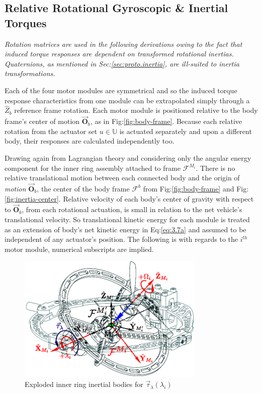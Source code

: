 \subsection{Relative Rotational Gyroscopic \& Inertial Torques}
\label{subsec:dynamics.nonlinearities.gyrotorques}
\emph{\color{gray}Rotation matrices are used in the following derivations owing to the fact that induced torque responses are dependent on transformed rotational inertias. Quaternions, as mentioned in Sec:\ref{sec:proto.inertia}, are ill-suited to inertia transformations.}
\par
Each of the four motor modules are symmetrical and so the induced torque response characteristics from one module can be extrapolated simply through a $\hat{Z}_b$ reference frame rotation. Each motor module is positioned relative to the body frame's center of motion $\vec{\mathbf{O}}_b$, as in Fig:\ref{fig:body-frame}. Because each relative rotation from the actuator set $u\in\mathbb{U}$ is actuated separately and upon a different body, their responses are calculated independently too.
\par
Drawing again from Lagrangian theory and considering only the angular energy component for the inner ring assembly attached to frame $\mathcal{F}^{M_i}$. There is no relative translational motion between each connected body and the origin of \emph{motion} $\vec{\mathbf{O}}_b$, the center of the body frame $\mathcal{F}^b$ from Fig:\ref{fig:body-frame} and Fig:\ref{fig:inertia-center}. Relative velocity of each body's center of gravity with respect to $\vec{\mathbf{O}}_b$, from each rotational actuation, is small in relation to the net vehicle's translational velocity. So translational kinetic energy for each module is treated as an extension of body's net kinetic energy in Eq:\ref{eq:3.7a} and assumed to be independent of any actuator's position. The following is with regards to the $i^{th}$ motor module, numerical subscripts are implied.
\begin{figure}[htbp]
\vspace{-12pt}
\centering
\includegraphics[width=0.8\textwidth]{figs/response-inner}
\vspace{-8pt}
\caption{Exploded inner ring inertial bodies for $\vec{\tau}_\lambda(\lambda_i)$}
\label{fig:response-inner}
\vspace{-16pt}
\end{figure}
